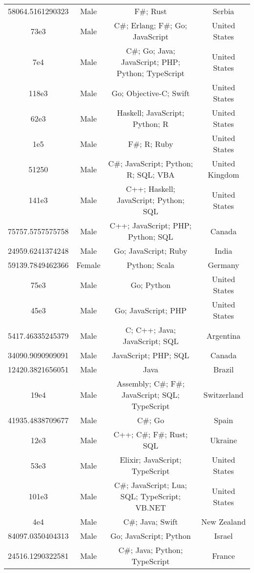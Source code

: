 \begin{center}
\begin{tabular}{ |c|c|c|c| }
58064.5161290323  &  Male  &  F\#; Rust  &  Serbia  \\ 
73e3  &  Male  &  C\#; Erlang; F\#; Go; JavaScript  &  United States  \\ 
7e4  &  Male  &  C\#; Go; Java; JavaScript; PHP; Python; TypeScript  &  United States  \\ 
118e3  &  Male  &  Go; Objective-C; Swift  &  United States  \\ 
62e3  &  Male  &  Haskell; JavaScript; Python; R  &  United States  \\ 
1e5  &  Male  &  F\#; R; Ruby  &  United States  \\ 
51250  &  Male  &  C\#; JavaScript; Python; R; SQL; VBA  &  United Kingdom  \\ 
141e3  &  Male  &  C++; Haskell; JavaScript; Python; SQL  &  United States  \\ 
75757.5757575758  &  Male  &  C++; JavaScript; PHP; Python; SQL  &  Canada  \\ 
24959.6241374248  &  Male  &  Go; JavaScript; Ruby  &  India  \\ 
59139.7849462366  &  Female  &  Python; Scala  &  Germany  \\ 
75e3  &  Male  &  Go; Python  &  United States  \\ 
45e3  &  Male  &  Go; JavaScript; PHP  &  United States  \\ 
5417.46335245379  &  Male  &  C; C++; Java; JavaScript; SQL  &  Argentina  \\ 
34090.9090909091  &  Male  &  JavaScript; PHP; SQL  &  Canada  \\ 
12420.3821656051  &  Male  &  Java  &  Brazil  \\ 
19e4  &  Male  &  Assembly; C\#; F\#; JavaScript; SQL; TypeScript  &  Switzerland  \\ 
41935.4838709677  &  Male  &  C\#; Go  &  Spain  \\ 
12e3  &  Male  &  C++; C\#; F\#; Rust; SQL  &  Ukraine  \\ 
53e3  &  Male  &  Elixir; JavaScript; TypeScript  &  United States  \\ 
101e3  &  Male  &  C\#; JavaScript; Lua; SQL; TypeScript; VB.NET  &  United States  \\ 
4e4  &  Male  &  C\#; Java; Swift  &  New Zealand  \\ 
84097.0350404313  &  Male  &  Go; JavaScript; Python  &  Israel  \\ 
24516.1290322581  &  Male  &  C\#; Java; Python; TypeScript  &  France  \\ 

\end{tabular}
\end{center}
